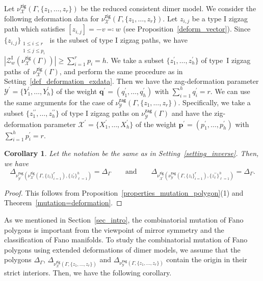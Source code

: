 \documentclass[pdftex]{sigma}%
\numberwithin{equation}{section}
\numberwithin{figure}{section}
\numberwithin{table}{section}
\newtheorem{Corollary}[Theorem]{Corollary}
\newcommand{\rmI}{\mathrm{I}}
\newcommand{\calX}{\mathcal{X}}
\newcommand{\calY}{\mathcal{Y}}
\newcommand{\calZ}{\mathcal{Z}}
\newcommand{\bfp}{\mathbf{p}}
\newcommand{\bfq}{\mathbf{q}}
\newcommand{\zig}{\mathsf{zig}}
\newcommand{\zag}{\mathsf{zag}}
\begin{document}
\begin{setting}
\label{setting_inverse}
Let $\nu^\zig_\calX(\Gamma,\{z_1,\dots,z_r\})$ be the reduced consistent dimer model.
We consider the following deformation data for $\nu^\zig_\calX(\Gamma,\{z_1,\dots,z_r\})$.
Let $z_{i,j}$ be a type I zigzag path which satisfies $[z_{i,j}]=-v\eqqcolon w$ (see Proposition~\ref{deform_vector}).
Since $\{z_{i,j}\}_{\substack{1\le i\le r \\ 1\le j\le p_i}}$ is the subset of type I zigzag paths, we have $|\calZ_{w}^\rmI(\nu^\zig_\calX(\Gamma))|\ge\sum_{i=1}^rp_i=h$.
We take a subset $\{z_1^\prime,\dots,z_h^\prime\}$ of type~I zigzag paths of~$\nu^\zig_\calX(\Gamma)$, and perform the same procedure as in Setting~\ref{def_deformation_exdata}.
Then we have the zag-deformation parameter $\calY^\prime=\{Y_1^\prime,\dots,Y_h^\prime\}$ of the weight $\bfq^\prime=(q_1^\prime,\dots,q_h^\prime)$ with $\sum_{i=1}^hq_i^\prime=r$.
We can use the same arguments for the case of $\nu^\zag_\calY(\Gamma,\{z_1,\dots,z_r\})$.
Specifically, we take a subset $\{z_1^{\prime\prime},\dots,z_h^{\prime\prime}\}$ of type I zigzag paths on $\nu^\zag_\calY(\Gamma)$ and have the zig-deformation parameter $\calX^\prime=\{X_1^\prime,\dots,X_h^\prime\}$ of the weight $\bfp^\prime=(p_1^\prime,\dots,p_h^\prime)$ with $\sum_{i=1}^hp_i^\prime=r$.
\end{setting}

\begin{Corollary}\label{cor_mut_inverse_on_polygon}
Let the notation be the same as in Setting~{\rm \ref{setting_inverse}}. Then, we have
\begin{displaymath}
\Delta_{\nu^\zag_{\calY^\prime}\left(\nu^\zig_\calX(\Gamma, \{z_i\}_{i=1}^r),\{z_\ell^\prime\}_{\ell=1}^h\right)}=\Delta_\Gamma \qquad \text{and} \qquad
\Delta_{\nu^\zig_{\calX^\prime}\left(\nu^\zag_\calY(\Gamma, \{z_i\}_{i=1}^r),\{z_\ell^{\prime\prime}\}_{\ell=1}^h\right)}=\Delta_\Gamma.
\end{displaymath}
\end{Corollary}

\begin{proof}
This follows from Proposition~\ref{properties_mutation_polygon}(1) and Theorem~\ref{mutation=deformation}.
\end{proof}

As we mentioned in Section~\ref{sec_intro}, the combinatorial mutation of Fano polygons is important from the viewpoint of mirror symmetry and the classification of Fano manifolds.
To study the combinatorial mutation of Fano polygons using extended deformations of dimer models, we assume that the polygons $\Delta_\Gamma$, $\Delta_{\nu^\zig_\calX(\Gamma, \{z_1,\dots,z_r\})}$ and $\Delta_{\nu^\zag_\calY(\Gamma, \{z_1,\dots,z_r\})}$ contain the origin in their strict interiors.
Then, we have the following corollary.
\end{document}
